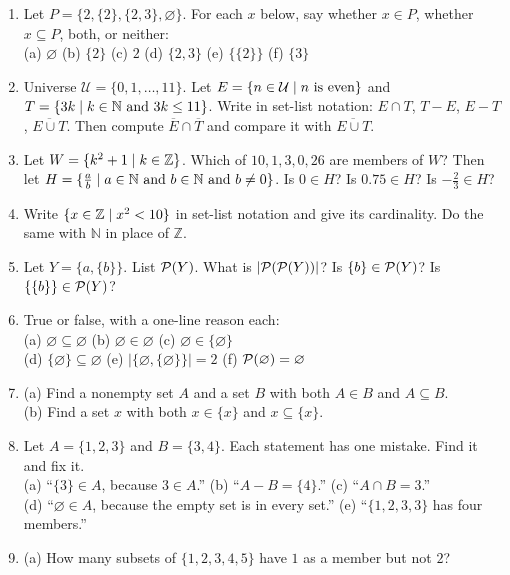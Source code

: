 \begin{enumerate}[label=\textbf{\arabic*.},leftmargin=1.8em,itemsep=0.35em]
  \item Let $P=\{2,\{2\},\{2,3\},\varnothing\}$. For each $x$ below, say whether $x\in P$, whether $x\subseteq P$, both, or neither:\\
  (a) $\varnothing$ \quad (b) $\{2\}$ \quad (c) $2$ \quad (d) $\{2,3\}$ \quad (e) $\{\{2\}\}$ \quad (f) $\{3\}$
  \item Universe $\mathcal{U}=\{0,1,\dots,11\}$. Let $E=\{n\in\mathcal{U}\mathrel{|} n\text{ is even}\}$ and $T=\{3k\mathrel{|} k\in\mathbb{N}\text{ and }3k\leq 11\}$. Write in set-list notation: $E\cap T$, $T-E$, $E-T$, $\overline{E\cup T}$. Then compute $\overline{E}\cap\overline{T}$ and compare it with $\overline{E\cup T}$.
  \item Let $W=\{k^2+1\mathrel{|} k\in\mathbb{Z}\}$. Which of $10, 1, 3, 0, 26$ are members of $W$? Then let $H=\{\frac ab\mathrel{|} a\in\mathbb{N}\text{ and }b\in\mathbb{N}\text{ and }b\neq0\}$. Is $0\in H$? Is $0.75\in H$? Is $-\frac23\in H$?
  \item Write $\{x\in\mathbb{Z}\mathrel{|} x^2<10\}$ in set-list notation and give its cardinality. Do the same with $\mathbb{N}$ in place of $\mathbb{Z}$.
  \item Let $Y=\{a,\{b\}\}$. List $\mathcal{P}(Y)$. What is $|\mathcal{P}(\mathcal{P}(Y))|$? Is $\{b\}\in\mathcal{P}(Y)$? Is $\{\{b\}\}\in\mathcal{P}(Y)$?
  \item True or false, with a one-line reason each:\\
  (a) $\varnothing\subseteq\varnothing$ \quad (b) $\varnothing\in\varnothing$ \quad (c) $\varnothing\in\{\varnothing\}$\\ (d) $\{\varnothing\}\subseteq\varnothing$ \quad (e) $|\{\varnothing,\{\varnothing\}\}|=2$ \quad (f) $\mathcal{P}(\varnothing)=\varnothing$
  \item (a) Find a nonempty set $A$ and a set $B$ with both $A\in B$ and $A\subseteq B$.\\
  (b) Find a set $x$ with both $x\in\{x\}$ and $x\subseteq\{x\}$.
  \item Let $A=\{1,2,3\}$ and $B=\{3,4\}$. Each statement has one mistake. Find it and fix it.\\
  (a) ``$\{3\}\in A$, because $3\in A$.'' \quad (b) ``$A-B=\{4\}$.'' \quad (c) ``$A\cap B=3$.''\\
  (d) ``$\varnothing\in A$, because the empty set is in every set.'' \quad (e) ``$\{1,2,3,3\}$ has four members.''
  \item (a) How many subsets of $\{1,2,3,4,5\}$ have $1$ as a member but not $2$?\\

\end{enumerate}
